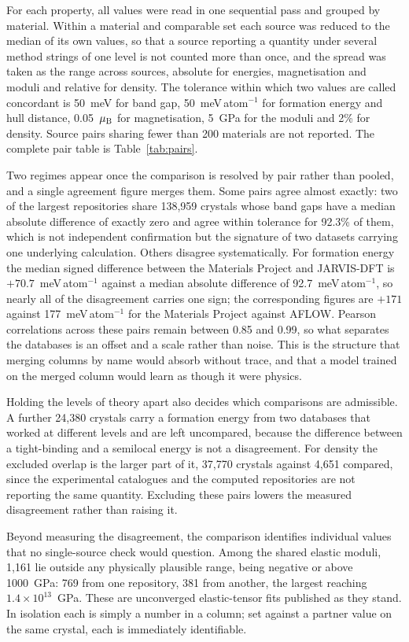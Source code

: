 For each property, all values were read in one sequential pass and grouped by
material. Within a material and comparable set each source was reduced to the
median of its own values, so that a source reporting a quantity under several
method strings of one level is not counted more than once, and the spread was
taken as the range across sources, absolute for energies, magnetisation and
moduli and relative for density. The
tolerance within which two values are called concordant is 50~meV for band gap,
50~meV\,atom$^{-1}$ for formation energy and hull distance, 0.05~$\mu_{\rm B}$
for magnetisation, 5~GPa for the moduli and 2\% for density. Source pairs sharing
fewer than 200 materials are not reported. The complete pair table is
Table~\ref{tab:pairs}.

Two regimes appear once the comparison is resolved by pair rather than pooled,
and a single agreement figure merges them. Some pairs agree almost exactly: two
of the largest repositories share 138{,}959 crystals whose band gaps have a
median absolute difference of exactly zero and agree within tolerance for 92.3\%
of them, which is not independent confirmation but the signature of two datasets
carrying one underlying calculation. Others disagree systematically. For
formation energy the median signed difference between the Materials Project and
JARVIS-DFT is $+70.7$~meV\,atom$^{-1}$ against a median absolute difference of
92.7~meV\,atom$^{-1}$, so nearly all of the disagreement carries one sign; the
corresponding figures are $+171$ against 177~meV\,atom$^{-1}$ for the Materials
Project against AFLOW. Pearson correlations across these pairs remain between
0.85 and 0.99, so what separates the databases is an offset and a scale rather
than noise. This is the structure that merging columns by name would absorb
without trace, and that a model trained on the merged column would learn as
though it were physics.

Holding the levels of theory apart also decides which comparisons are admissible.
A further 24{,}380 crystals carry a formation energy from two databases that
worked at different levels and are left uncompared, because the difference
between a tight-binding and a semilocal energy is not a disagreement. For density
the excluded overlap is the larger part of it, 37{,}770 crystals against 4{,}651
compared, since the experimental catalogues and the computed repositories are not
reporting the same quantity. Excluding these pairs lowers the measured
disagreement rather than raising it.

Beyond measuring the disagreement, the comparison identifies individual values
that no single-source check would question. Among the shared elastic moduli,
1{,}161 lie outside any physically plausible range, being negative or above
1000~GPa: 769 from one repository, 381 from another, the largest reaching
$1.4\times10^{13}$~GPa. These are unconverged elastic-tensor fits published as
they stand. In isolation each is simply a number in a column; set against a
partner value on the same crystal, each is immediately identifiable.

